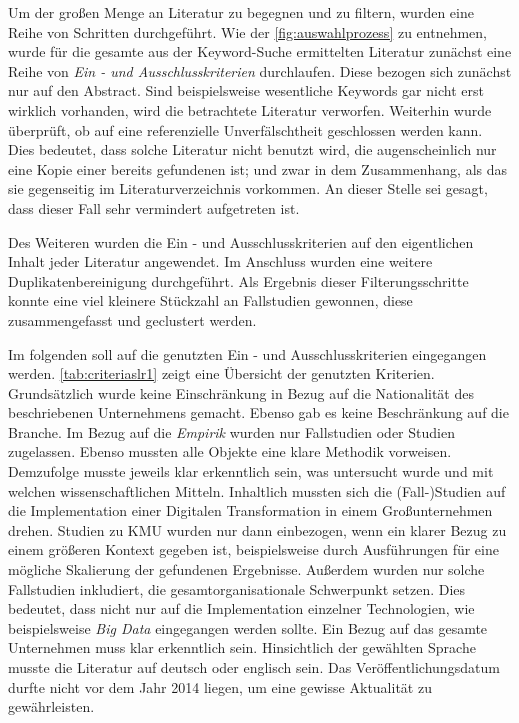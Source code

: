 Um der großen Menge an Literatur zu begegnen und zu filtern, wurden eine Reihe von Schritten durchgeführt. Wie der \ref{fig:auswahlprozess} zu entnehmen, wurde für die gesamte aus der Keyword-Suche ermittelten Literatur zunächst eine Reihe von \textit{Ein - und Ausschlusskriterien} durchlaufen. Diese bezogen sich zunächst nur auf den Abstract. Sind beispielsweise wesentliche Keywords gar nicht erst wirklich vorhanden, wird die betrachtete Literatur verworfen. Weiterhin wurde überprüft, ob auf eine referenzielle Unverfälschtheit geschlossen werden kann. Dies bedeutet, dass solche Literatur nicht benutzt wird, die augenscheinlich nur eine Kopie einer bereits gefundenen ist; und zwar in dem Zusammenhang, als das sie gegenseitig im Literaturverzeichnis vorkommen. An dieser Stelle sei gesagt, dass dieser Fall sehr vermindert aufgetreten ist. 

Des Weiteren wurden die Ein - und Ausschlusskriterien auf den eigentlichen Inhalt jeder Literatur angewendet. Im Anschluss wurden eine weitere Duplikatenbereinigung durchgeführt. Als Ergebnis dieser Filterungsschritte konnte eine viel kleinere Stückzahl an Fallstudien gewonnen, diese zusammengefasst und geclustert werden.

Im folgenden soll auf die genutzten Ein - und Ausschlusskriterien eingegangen werden. \ref{tab:criteriaslr1} zeigt eine Übersicht der genutzten Kriterien. Grundsätzlich wurde keine Einschränkung in Bezug auf die Nationalität des beschriebenen Unternehmens gemacht. Ebenso gab es keine Beschränkung auf die Branche. Im Bezug auf die \textit{Empirik} wurden nur Fallstudien oder Studien zugelassen. Ebenso mussten alle Objekte eine klare Methodik vorweisen. Demzufolge musste jeweils klar erkenntlich sein, was untersucht wurde und mit welchen wissenschaftlichen Mitteln. Inhaltlich mussten sich die (Fall-)Studien auf die  Implementation einer Digitalen Transformation in einem Großunternehmen drehen. Studien zu KMU wurden  nur dann einbezogen, wenn ein klarer Bezug zu einem größeren Kontext gegeben ist, beispielsweise durch Ausführungen für eine mögliche Skalierung der gefundenen Ergebnisse. Außerdem wurden nur solche Fallstudien inkludiert, die  gesamtorganisationale Schwerpunkt setzen. Dies bedeutet, dass nicht nur auf die Implementation einzelner Technologien, wie beispielsweise \textit{Big Data} eingegangen werden sollte. Ein Bezug auf  das gesamte Unternehmen muss klar erkenntlich sein. Hinsichtlich der gewählten Sprache musste die Literatur auf deutsch oder englisch sein. Das Veröffentlichungsdatum durfte nicht vor dem Jahr 2014 liegen, um eine gewisse Aktualität zu gewährleisten.

